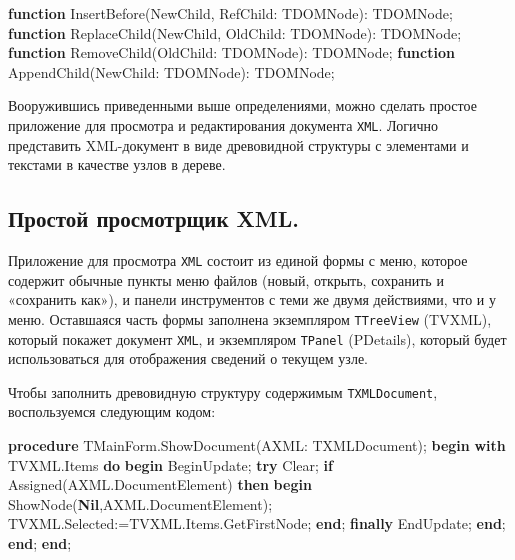\documentclass[
]{article}
\newenvironment{Shaded}{}{}
\newcommand{\KeywordTok}[1]{\textcolor[rgb]{0.00,0.44,0.13}{\textbf{#1}}}
\newcommand{\NormalTok}[1]{#1}
\begin{document}
\begin{Shaded}
\begin{Highlighting}[]
\KeywordTok{function}\NormalTok{ InsertBefore(NewChild, RefChild: TDOMNode): TDOMNode; }
\KeywordTok{function}\NormalTok{ ReplaceChild(NewChild, OldChild: TDOMNode): TDOMNode; }
\KeywordTok{function}\NormalTok{ RemoveChild(OldChild: TDOMNode): TDOMNode; }
\KeywordTok{function}\NormalTok{ AppendChild(NewChild: TDOMNode): TDOMNode;}
\end{Highlighting}
\end{Shaded}

Вооружившись приведенными выше определениями, можно сделать простое
приложение для просмотра и редактирования документа \texttt{XML}.
Логично представить XML-документ в виде древовидной структуры с
элементами и текстами в качестве узлов в дереве.

\hypertarget{header-n2468}{%
\subsection{Простой просмотрщик XML.}\label{header-n2468}}

Приложение для просмотра \texttt{XML} состоит из единой формы с меню,
которое содержит обычные пункты меню файлов (новый, открыть, сохранить и
«сохранить как»), и панели инструментов с теми же двумя действиями, что
и у меню. Оставшаяся часть формы заполнена экземпляром
\texttt{TTreeView} (TVXML), который покажет документ \texttt{XML}, и
экземпляром \texttt{TPanel} (PDetails), который будет использоваться для
отображения сведений о текущем узле.

Чтобы заполнить древовидную структуру содержимым \texttt{TXMLDocument},
воспользуемся следующим кодом:

\begin{Shaded}
\begin{Highlighting}[]
\KeywordTok{procedure}\NormalTok{ TMainForm.ShowDocument(AXML: TXMLDocument); }
\KeywordTok{begin} 
  \KeywordTok{with}\NormalTok{ TVXML.Items }\KeywordTok{do} 
  \KeywordTok{begin} 
\NormalTok{    BeginUpdate; }
    \KeywordTok{try} 
\NormalTok{      Clear; }
      \KeywordTok{if}\NormalTok{ Assigned(AXML.DocumentElement) }\KeywordTok{then} 
      \KeywordTok{begin} 
\NormalTok{        ShowNode(}\KeywordTok{Nil}\NormalTok{,AXML.DocumentElement);}
\NormalTok{        TVXML.Selected:=TVXML.Items.GetFirstNode; }
      \KeywordTok{end}\NormalTok{; }
    \KeywordTok{finally} 
\NormalTok{      EndUpdate; }
    \KeywordTok{end}\NormalTok{;}
  \KeywordTok{end}\NormalTok{; }
\KeywordTok{end}\NormalTok{;}
\end{Highlighting}
\end{Shaded}
\end{document}
